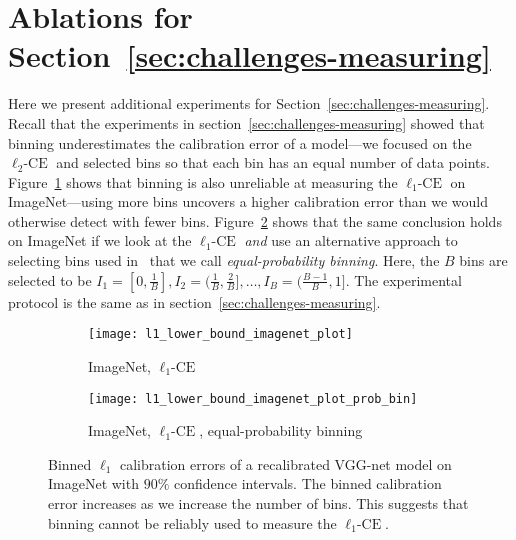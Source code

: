 \newpage
\section{Ablations for Section~\ref{sec:challenges-measuring}}
\label{sec:appendix_platt_experiments}

Here we present additional experiments for Section~\ref{sec:challenges-measuring}.
Recall that the experiments in section~\ref{sec:challenges-measuring} showed that binning underestimates the calibration error of a model---we focused on the $\ell_2\mbox{-CE}$ and selected bins so that each bin has an equal number of data points. Figure~\ref{fig:imagenet_lower_bound_l1} shows that binning is also unreliable at measuring the $\ell_1\mbox{-CE}$ on ImageNet---using more bins uncovers a higher calibration error than we would otherwise detect with fewer bins. Figure~\ref{fig:imagenet_lower_bound_l1_prob} shows that the same conclusion holds on ImageNet if we look at the $\ell_1\mbox{-CE}$ \emph{and} use an alternative approach to selecting bins used in~\cite{guo2017calibration} that we call \emph{equal-probability binning}. Here, the $B$ bins are selected to be $I_1 = [0, \frac{1}{B}], I_2 = (\frac{1}{B}, \frac{2}{B}], \dots, I_B = (\frac{B-1}{B}, 1]$. The experimental protocol is the same as in section~\ref{sec:challenges-measuring}.

\begin{figure}
     \centering
     \begin{subfigure}[b]{0.45\textwidth}
         \centering
         \texttt{[image: l1\_lower\_bound\_imagenet\_plot]}
         \caption{ImageNet, $\ell_1\mbox{-CE}$}
         \label{fig:imagenet_lower_bound_l1}
     \end{subfigure}
     \hfill
     \begin{subfigure}[b]{0.45\textwidth}
         \centering
         \texttt{[image: l1\_lower\_bound\_imagenet\_plot\_prob\_bin]}
         \caption{ImageNet, $\ell_1\mbox{-CE}$, equal-probability binning}
         \label{fig:imagenet_lower_bound_l1_prob}
     \end{subfigure}
        \caption{
        Binned $\ell_1$ calibration errors of a recalibrated VGG-net model on ImageNet with $90\%$ confidence intervals. The binned calibration error increases as we increase the number of bins. This suggests that binning cannot be reliably used to measure the $\ell_1\mbox{-CE}$.
        }
        \label{fig:lower_bounds_l1_imagenet}
\end{figure}

